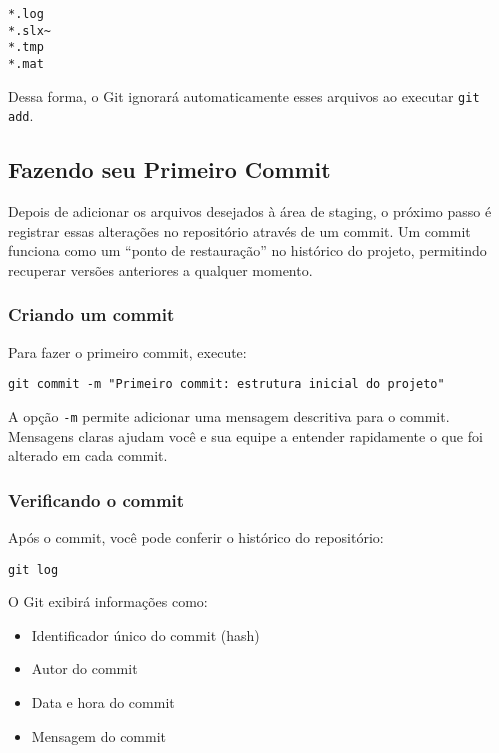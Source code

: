 \begin{lstlisting}[style=shellstyle]
*.log
*.slx~
*.tmp
*.mat
\end{lstlisting}

Dessa forma, o Git ignorará automaticamente esses arquivos ao executar \texttt{git add}.

\subsection{Fazendo seu Primeiro Commit}

Depois de adicionar os arquivos desejados à área de staging, o próximo passo é registrar essas alterações no repositório através de um commit. Um commit funciona como um “ponto de restauração” no histórico do projeto, permitindo recuperar versões anteriores a qualquer momento.

\subsubsection*{Criando um commit}

Para fazer o primeiro commit, execute:

\begin{lstlisting}[style=shellstyle]
git commit -m "Primeiro commit: estrutura inicial do projeto"
\end{lstlisting}

\noindent
A opção \texttt{-m} permite adicionar uma mensagem descritiva para o commit. Mensagens claras ajudam você e sua equipe a entender rapidamente o que foi alterado em cada commit.

\subsubsection*{Verificando o commit}

Após o commit, você pode conferir o histórico do repositório:

\begin{lstlisting}[style=shellstyle]
git log
\end{lstlisting}

O Git exibirá informações como:
\begin{itemize}
    \item Identificador único do commit (hash)  
    \item Autor do commit  
    \item Data e hora do commit  
    \item Mensagem do commit
\end{itemize}